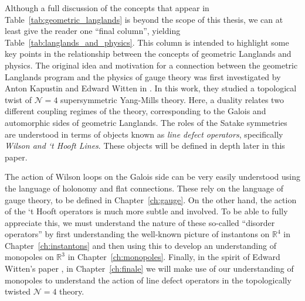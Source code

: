 Although a full discussion of the concepts that appear in Table~\ref{tab:geometric_langlands} is beyond the scope of this thesis, we can at least give the reader one ``final column'', yielding Table~\ref{tab:langlands_and_physics}. This column is intended to highlight some key points in the relationship between the concepts of geometric Langlands and physics. The original idea and motivation for a connection between the geometric Langlands program and the physics of gauge theory was first investigated by Anton Kapustin and Edward Witten in \cite{kapustin2006}. In this work, they studied a topological twist of $\mathcal N = 4$ supersymmetric Yang-Mills theory. Here, a duality relates two different coupling regimes of the theory, corresponding to the Galois and automorphic sides of geometric Langlands. The roles of the Satake symmetries are understood in terms of objects known as \emph{line defect operators}, specifically \emph{Wilson and `t Hooft Lines}. These objects will be defined in depth later in this paper. 


The action of Wilson loops on the Galois side can be very easily understood using the language of holonomy and flat connections. These rely on the language of gauge theory, to be defined in Chapter~\ref{ch:gauge}. On the other hand, the action of the `t Hooft operators is much more subtle and involved. To be able to fully appreciate this, we must understand the nature of these so-called ``disorder operators'' by first understanding the well-known picture of instantons on $\mathbb R^4$ in Chapter~\ref{ch:instantons} and then using this to develop an understanding of monopoles on $\mathbb R^3$ in Chapter~\ref{ch:monopoles}. Finally, in the spirit of Edward Witten's paper \cite{witten2010}, in Chapter~\ref{ch:finale} we will make use of our understanding of monopoles to understand the action of line defect operators in the topologically twisted $\mathcal N=4$ theory.

